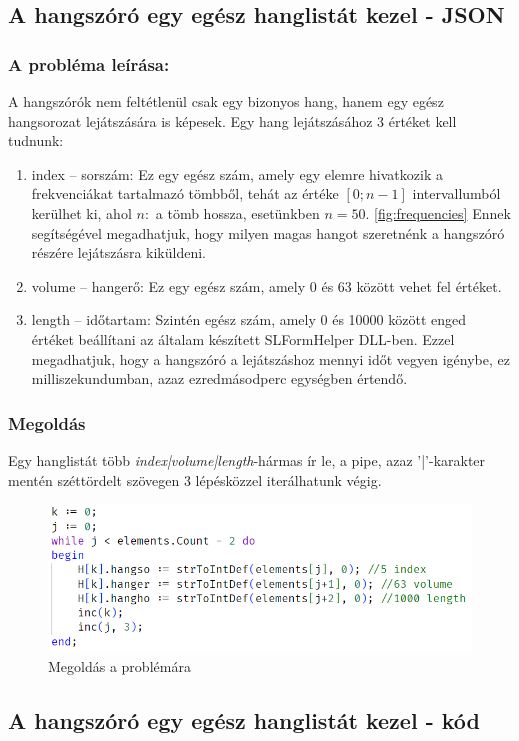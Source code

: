 \documentclass[tocnopagenum]{thesis-ekf}
\theoremstyle{definition}
\theoremstyle{remark}
\begin{document}
	\subsection{A hangszóró egy egész hanglistát kezel - JSON}
	\subsubsection{A probléma leírása:} A hangszórók nem feltétlenül csak egy bizonyos hang, hanem egy egész hangsorozat lejátszására is képesek. Egy hang lejátszásához 3 értéket kell tudnunk:
	\begin{enumerate}
		\item index -- sorszám: Ez egy egész szám, amely egy elemre hivatkozik a frekvenciákat tartalmazó tömbből, tehát az értéke $[0;n-1]$ intervallumból kerülhet ki, ahol $n: $ a tömb hossza, esetünkben $n=50$. \ref{fig:frequencies} Ennek segítségével megadhatjuk, hogy milyen magas hangot szeretnénk a hangszóró részére lejátszásra kiküldeni.
		\item volume -- hangerő: Ez egy egész szám, amely 0 és 63 között vehet fel értéket.
		\item length -- időtartam: Szintén egész szám, amely 0 és 10000 között enged értéket beállítani az általam készített SLFormHelper DLL-ben. Ezzel megadhatjuk, hogy a hangszóró a lejátszáshoz mennyi időt vegyen igénybe, ez milliszekundumban, azaz ezredmásodperc egységben értendő.
	\end{enumerate}
	\subsubsection{Megoldás}
	Egy hanglistát több \textit{index|volume|length}-hármas ír le, a pipe, azaz '|'-karakter mentén széttördelt szövegen 3 lépésközzel iterálhatunk végig.
	\begin{figure}[h!]
		\centering
		\includegraphics{speaker_solved}
		\caption{Megoldás a problémára}
		\label{speaker_solved}
	\end{figure}
	\subsection{A hangszóró egy egész hanglistát kezel - kód}
\end{document}
